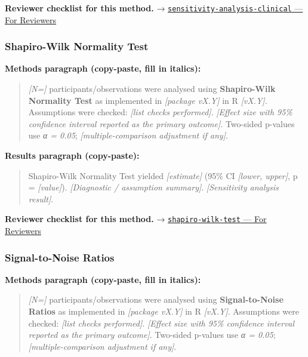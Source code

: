\documentclass[
]{article}
\begin{document}
\textbf{Reviewer checklist for this method.} →
\href{../chapters/14-clinical/sensitivity-analysis-clinical.Rmd\#for-reviewers}{\texttt{sensitivity-analysis-clinical}
--- For Reviewers}

\subsubsection{Shapiro-Wilk Normality
Test}\label{shapiro-wilk-normality-test}

\textbf{Methods paragraph (copy-paste, fill in italics):}

\begin{quote}
\emph{{[}N={]}} participants/observations were analysed using
\textbf{Shapiro-Wilk Normality Test} as implemented in \emph{{[}package
vX.Y{]}} in R \emph{{[}vX.Y{]}}. Assumptions were checked: \emph{{[}list
checks performed{]}}. \emph{{[}Effect size with 95\% confidence interval
reported as the primary outcome{]}}. Two-sided p-values use \emph{α =
0.05}; \emph{{[}multiple-comparison adjustment if any{]}}.
\end{quote}

\textbf{Results paragraph (copy-paste):}

\begin{quote}
Shapiro-Wilk Normality Test yielded \emph{{[}estimate{]}} (95\% CI
\emph{{[}lower, upper{]}}, p = \emph{{[}value{]}}). \emph{{[}Diagnostic
/ assumption summary{]}}. \emph{{[}Sensitivity analysis result{]}}.
\end{quote}

\textbf{Reviewer checklist for this method.} →
\href{../chapters/04-inferential/shapiro-wilk-test.Rmd\#for-reviewers}{\texttt{shapiro-wilk-test}
--- For Reviewers}

\subsubsection{Signal-to-Noise Ratios}\label{signal-to-noise-ratios}

\textbf{Methods paragraph (copy-paste, fill in italics):}

\begin{quote}
\emph{{[}N={]}} participants/observations were analysed using
\textbf{Signal-to-Noise Ratios} as implemented in \emph{{[}package
vX.Y{]}} in R \emph{{[}vX.Y{]}}. Assumptions were checked: \emph{{[}list
checks performed{]}}. \emph{{[}Effect size with 95\% confidence interval
reported as the primary outcome{]}}. Two-sided p-values use \emph{α =
0.05}; \emph{{[}multiple-comparison adjustment if any{]}}.
\end{quote}
\end{document}
